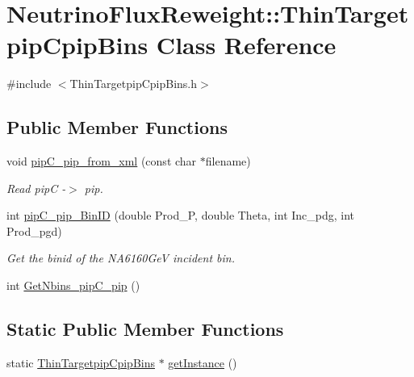 \hypertarget{class_neutrino_flux_reweight_1_1_thin_targetpip_cpip_bins}{\section{Neutrino\-Flux\-Reweight\-:\-:Thin\-Targetpip\-Cpip\-Bins Class Reference}
\label{class_neutrino_flux_reweight_1_1_thin_targetpip_cpip_bins}
}


{\ttfamily \#include $<$Thin\-Targetpip\-Cpip\-Bins.\-h$>$}

\subsection*{Public Member Functions}
\begin{DoxyCompactItemize}
\item 
void \hyperlink{class_neutrino_flux_reweight_1_1_thin_targetpip_cpip_bins_aba39b73425877781c192879b07c24a7b}{pip\-C\-\_\-pip\-\_\-from\-\_\-xml} (const char $\ast$filename)
\begin{DoxyCompactList}\small\item\em Read pip\-C -\/$>$ pip. \end{DoxyCompactList}\item 
int \hyperlink{class_neutrino_flux_reweight_1_1_thin_targetpip_cpip_bins_a36213c657851ba9349693f517b9977a8}{pip\-C\-\_\-pip\-\_\-\-Bin\-I\-D} (double Prod\-\_\-\-P, double Theta, int Inc\-\_\-pdg, int Prod\-\_\-pgd)
\begin{DoxyCompactList}\small\item\em Get the binid of the N\-A6160\-Ge\-V incident bin. \end{DoxyCompactList}\item 
int \hyperlink{class_neutrino_flux_reweight_1_1_thin_targetpip_cpip_bins_af61921bba0f40062e3a483584c99772d}{Get\-Nbins\-\_\-pip\-C\-\_\-pip} ()
\end{DoxyCompactItemize}
\subsection*{Static Public Member Functions}
\begin{DoxyCompactItemize}
\item 
static \hyperlink{class_neutrino_flux_reweight_1_1_thin_targetpip_cpip_bins}{Thin\-Targetpip\-Cpip\-Bins} $\ast$ \hyperlink{class_neutrino_flux_reweight_1_1_thin_targetpip_cpip_bins_aa9b4bec763ea562867a0d8ab9415f2c8}{get\-Instance} ()
\end{DoxyCompactItemize}
